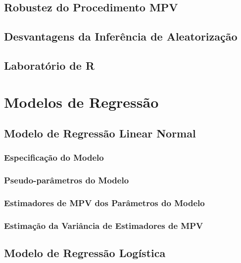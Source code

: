 \documentclass[]{book}
\theoremstyle{definition}
\theoremstyle{definition}
\theoremstyle{definition}
\theoremstyle{remark}
\begin{document}
\section{Robustez do Procedimento
MPV}\label{robustez-do-procedimento-mpv}

\section{Desvantagens da Inferência de
Aleatorização}\label{desvantagens-da-inferencia-de-aleatorizacao}

\section{Laboratório de R}\label{laboratorio-de-r-2}

\chapter{Modelos de Regressão}\label{modreg}

\section{Modelo de Regressão Linear Normal}\label{modlinear}

\subsection{Especificação do Modelo}\label{especificacao-do-modelo}

\subsection{Pseudo-parâmetros do
Modelo}\label{pseudo-parametros-do-modelo}

\subsection{Estimadores de MPV dos Parâmetros do
Modelo}\label{estimadores-de-mpv-dos-parametros-do-modelo}

\subsection{Estimação da Variância de Estimadores de
MPV}\label{estimacao-da-variancia-de-estimadores-de-mpv}

\section{Modelo de Regressão Logística}\label{modlogist}
\end{document}
